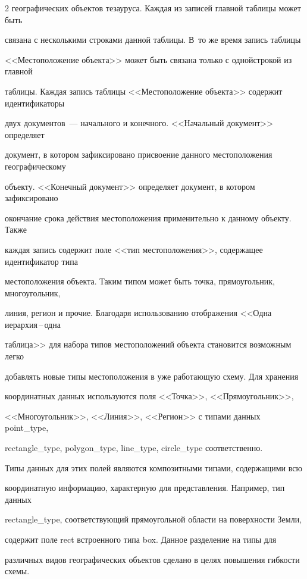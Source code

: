 \begin{multicols}{2}
географических объектов тезауруса. Каж\-дая из записей главной таблицы может быть 

связана с несколькими строками данной таб\-ли\-цы. В~то же время запись таб\-ли\-цы 

<<Местоположение объекта>> может быть связана только с одной\linebreak строкой из главной 

таблицы. Каждая запись таб\-ли\-цы <<Местоположение объекта>> содержит идентификаторы 

двух документов~--- начального и конечного. <<Начальный документ>> определяет\linebreak 

документ, в котором зафиксировано присвоение данного мес\-то\-по\-ло\-же\-ния географическому 

объекту. <<Конечный документ>> определяет документ, в котором зафиксировано 

окончание срока действия местоположения применительно к данному объекту. Также 

каждая запись содержит поле <<тип местоположения>>, содержащее идентификатор типа 

местоположения объекта. Таким типом может быть точка, прямоугольник, многоугольник, 

линия, регион и прочие. Благодаря использованию отображения <<Одна ие\-рар\-хия\,--\,од\-на 

таблица>> для набора типов местоположений объекта становится возможным легко 

добавлять новые типы местоположения в уже работающую схему. Для хранения 

координатных данных используются поля <<Точка>>, <<Прямоугольник>>, 

<<Многоугольник>>, <<Линия>>, <<Регион>> с типами данных {point\_type}, 

{rectangle\_type}, {polygon\_type}, {line\_type}, {circle\_type} соответственно. 

Типы данных для этих полей являются композитными типами, содержащими всю 

координатную информацию, характерную для представления. Например, тип данных 

{rectangle\_type}, соответствующий прямоугольной области на поверхности Земли, 

содержит поле {rect} встроенного типа {box}. Данное разделение на типы для 

различных видов географических объектов сделано в целях повышения гибкости схемы.


\end{multicols}
